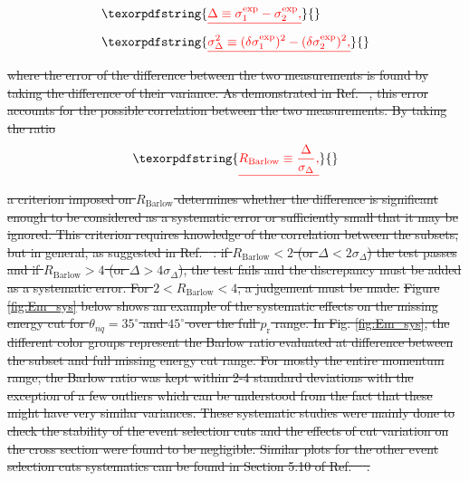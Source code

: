 \documentclass[aps, prl]{revtex4-2}  %
\providecommand{\DIFdeltex}[1]{{\protect\color{red}\sout{#1}}}                      %
\providecommand{\DIFdel}[1]{\texorpdfstring{\DIFdeltex{#1}}{}} %
\begin{document}
\begin{align*}
    &\DIFdel{\Delta \equiv \sigma^{\mathrm{exp}}_{\mathrm{1}} - \sigma^{\mathrm{exp}}_{\mathrm{2}}, }\\
    &\DIFdel{\sigma^{2}_{\Delta} \equiv (\delta\sigma^{\mathrm{exp}}_{\mathrm{1}})^{2} - (\delta\sigma^{\mathrm{exp}}_{\mathrm{2}})^{2},
  }\end{align*}%
\DIFdel{where the error of the difference between the two measurements is found by taking the difference of their variance. As demonstrated in Ref.\mbox{%
\cite{barlow2002systematic}}\hspace{0pt}%
, this
error accounts for the possible correlation between the two measurements. By taking the ratio
}\begin{displaymath}
  \DIFdel{R_{\mathrm{Barlow}} \equiv \frac{\Delta}{\sigma_{\Delta}},
}\end{displaymath}%
\DIFdel{a criterion imposed on $R_{\mathrm{Barlow}}$ determines whether the difference is significant enough to be considered as a systematic error or sufficiently small that it may be
ignored. This criterion requires knowledge of the correlation between the subsets, but in general, as suggested in Ref.\mbox{%
\cite{barlow2017}}\hspace{0pt}%
: if $R_{\mathrm{Barlow}} < 2$ (or $\Delta <2\sigma_{\Delta}$)
the test passes and if $R_{\mathrm{Barlow}} > 4$ (or $\Delta >4\sigma_{\Delta}$), the test fails and the discrepancy must be added as a systematic error. For $2<R_{\mathrm{Barlow}}<4$, a judgement must be made.}%
\DIFdel{Figure \ref{fig:Em_sys} below shows an example of the systematic effects on the missing energy cut for $\theta_{nq}=35^{\circ}$ and $45^{\circ}$ over the full $p_{\mathrm{r}}$ range.
In Fig. \ref{fig:Em_sys}, the different color groups represent the Barlow ratio evaluated at difference between the subset and full missing energy cut range. For mostly the entire momentum range,
the Barlow ratio was kept within 2-4 standard deviations with the exception of a few outliers which can be understood from the fact that these might have very similar variances. These systematic
studies were mainly done to check the stability of the event selection cuts and the effects of cut variation on the cross section were found to be negligible. Similar plots for the other event selection
cuts systematics can be found in Section 5.10 of Ref. \mbox{%
\cite{cyero_phdthesis}}\hspace{0pt}%
. 
}%
\end{document}
